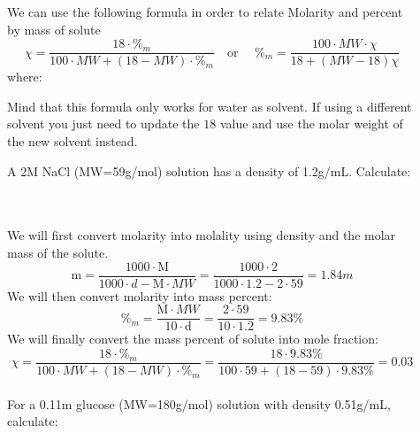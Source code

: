 \documentclass[main.tex]{subfiles}
\newcommand\chapterlabel{physicalsolutions}
\begin{document}
\begin{description}
\item[] 
We can use the following formula in order to relate Molarity and percent by mass of solute
\begin{equation}
\boxed{ \chi=\frac{18\cdot  \%_{m}  }{100\cdot MW + (18-MW)\cdot \%_{m} }}
\quad  \text{or }\quad 
\boxed{ \%_{m}=\frac{ 100\cdot MW\cdot \chi  }{ 18+(MW-18)\chi }}
\label{\chapterlabel:equation9}
\end{equation}
where:
Mind that this formula only works for water as solvent. If using a different solvent you just need to update the $18$ value and use the molar weight of the new solvent instead.
\begin{example} %
A 2M NaCl (MW=59g/mol) solution has a density of 1.2g/mL. Calculate: 
\\
 \\
 We will first convert molarity into molality using density and the molar mass of the solute.
 \[\text{m}=\frac{1000\cdot \text{M}}{1000\cdot d - \text{M}\cdot MW}=\frac{1000\cdot 2}{1000\cdot 1.2 - 2\cdot 59}=1.84m\]
 We will then convert molarity into mass percent:
 \[ \%_m=\frac{\text{M}\cdot MW }{10\cdot \text{d} }=\frac{2\cdot 59 }{10\cdot 1.2 }=9.83\%\]
 We will finally convert the mass percent of solute into mole fraction:
 \[\chi=\frac{18\cdot  \%_{m}  }{100\cdot MW + (18-MW)\cdot \%_{m} }=\frac{18\cdot  9.83\%  }{100\cdot 59 + (18-59)\cdot 9.83\%  }=0.03\]
\faDiamond\ \\
For a 0.11m glucose (MW=180g/mol) solution with density 0.51g/mL, calculate:

\end{example}
\end{description}
\end{document}
